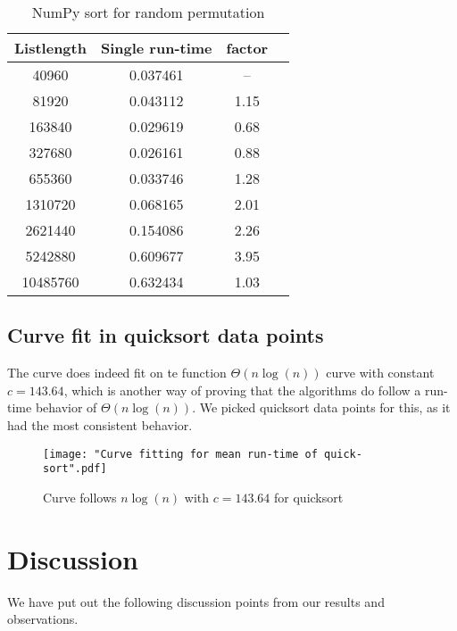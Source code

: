 \documentclass[sigconf, nonacm, natbib, screen, balance=False]{acmart}
\begin{document}
\begin{table}[ht]
\caption{NumPy sort for random permutation }
\label{tab:table3}
\begin{center}
\begin{tabular}{|c|c|c|c|} 
\hline
\textbf{Listlength} & 	\textbf{Single run-time} & \textbf{factor} \\ 
\hline
40960 & 	0.037461 & --	 \\ 
81920 & 	0.043112 & 	1.15 \\ 
163840 & 	0.029619 & 	0.68 \\ 
327680 & 	0.026161 & 	0.88 \\ 
655360 & 	0.033746 & 	1.28 \\ 
1310720 & 	0.068165 & 	2.01 \\ 
2621440 & 	0.154086 & 	2.26 \\ 
5242880 & 	0.609677 & 	3.95 \\ 
10485760 & 	0.632434 & 	1.03 \\ 

\hline
\end{tabular}
\end{center}
\end{table}

\subsection{Curve fit in quicksort data points}\label{sec:curveresult}
The curve does indeed fit on te function $\Theta \left(n\log\left(n\right)\right)$ curve with constant $c=143.64$, which is another way of proving that the algorithms do follow a run-time behavior of $\Theta \left(n\log\left(n\right)\right)$. We picked quicksort data points for this, as it had the most consistent behavior.

\begin{figure}[ht]
\texttt{[image: "Curve fitting for mean run-time of quick-sort".pdf]}
    \caption{Curve follows $n \log\left(n\right)$ with $c= 143.64$ for quicksort}
    \label{fig:curvefit}
\end{figure}

\section{Discussion}\label{sec:discussion}
We have put out the following discussion points from our results and observations.
\end{document}
